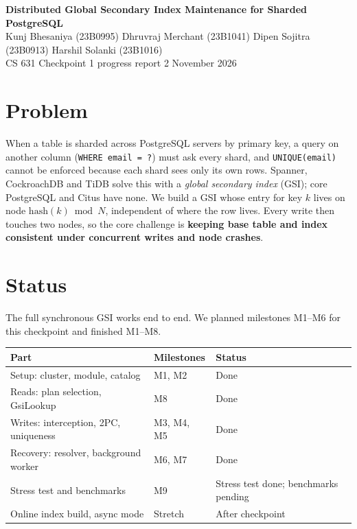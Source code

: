\documentclass[11pt,a4paper]{article}
\begin{document}
\begin{center}
  {\Large\bfseries Distributed Global Secondary Index Maintenance for Sharded PostgreSQL}\\[4pt]
  Kunj Bhesaniya (23B0995) \quad Dhruvraj Merchant (23B1041) \quad
  Dipen Sojitra (23B0913) \quad Harshil Solanki (23B1016)\\[2pt]
  {\small CS 631 \textperiodcentered{} Checkpoint 1 progress report \textperiodcentered{} 2 November 2026}
\end{center}

\section*{Problem}
When a table is sharded across PostgreSQL servers by primary key, a query on another column
(\texttt{WHERE email = ?}) must ask every shard, and \texttt{UNIQUE(email)} cannot be enforced because
each shard sees only its own rows. Spanner, CockroachDB and TiDB solve this with a \emph{global
secondary index} (GSI); core PostgreSQL and Citus have none. We build a GSI whose entry for key $k$
lives on node $\mathrm{hash}(k) \bmod N$, independent of where the row lives. Every write then touches
two nodes, so the core challenge is \textbf{keeping base table and index consistent under concurrent
writes and node crashes}.

\section*{Status}
The full synchronous GSI works end to end. We planned milestones M1--M6 for this checkpoint and
finished M1--M8.

\begin{center}
\begin{tabular}{lll}
\toprule
Part & Milestones & Status \\
\midrule
Setup: cluster, module, catalog          & M1, M2     & Done \\
Reads: plan selection, GsiLookup         & M8         & Done \\
Writes: interception, 2PC, uniqueness    & M3, M4, M5 & Done \\
Recovery: resolver, background worker    & M6, M7     & Done \\
Stress test and benchmarks               & M9         & Stress test done; benchmarks pending \\
Online index build, async mode           & Stretch    & After checkpoint \\
\bottomrule
\end{tabular}
\end{center}
\end{document}
